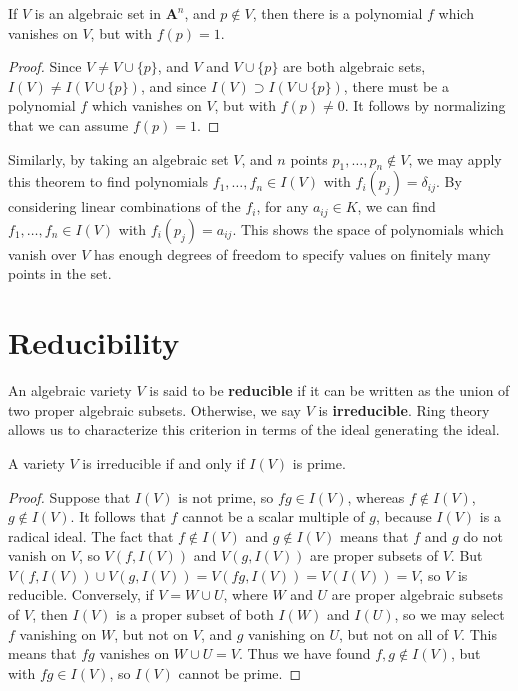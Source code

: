 \begin{corollary}
    If $V$ is an algebraic set in $\mathbf{A}^n$, and $p \not \in V$, then there is a polynomial $f$ which vanishes on $V$, but with $f(p) = 1$.
\end{corollary}
\begin{proof}
    Since $V \neq V \cup \{ p \}$, and $V$ and $V \cup \{ p \}$ are both algebraic sets, $I(V) \neq I(V \cup \{ p \})$, and since $I(V) \supset I(V \cup \{ p \})$, there must be a polynomial $f$ which vanishes on $V$, but with $f(p) \neq 0$. It follows by normalizing that we can assume $f(p) = 1$.
\end{proof}

Similarly, by taking an algebraic set $V$, and $n$ points $p_1, \dots, p_n \not \in V$, we may apply this theorem to find polynomials $f_1, \dots, f_n \in I(V)$ with $f_i(p_j) = \delta_{ij}$. By considering linear combinations of the $f_i$, for any $a_{ij} \in K$, we can find $f_1, \dots, f_n \in I(V)$ with $f_i(p_j) = a_{ij}$. This shows the space of polynomials which vanish over $V$ has enough degrees of freedom to specify values on finitely many points in the set.

\section{Reducibility}

An algebraic variety $V$ is said to be {\bf reducible} if it can be written as the union of two proper algebraic subsets. Otherwise, we say $V$ is {\bf irreducible}. Ring theory allows us to characterize this criterion in terms of the ideal generating the ideal.

\begin{prop}
    A variety $V$ is irreducible if and only if $I(V)$ is prime.
\end{prop}
\begin{proof}
    Suppose that $I(V)$ is not prime, so $fg \in I(V)$, whereas $f \not \in I(V)$, $g \not \in I(V)$. It follows that $f$ cannot be a scalar multiple of $g$, because $I(V)$ is a radical ideal. The fact that $f \not \in I(V)$ and $g \not \in I(V)$ means that $f$ and $g$ do not vanish on $V$, so $V(f, I(V))$ and $V(g, I(V))$ are proper subsets of $V$. But $V(f, I(V)) \cup V(g, I(V)) = V(fg, I(V)) = V(I(V)) = V$, so $V$ is reducible. Conversely, if $V = W \cup U$, where $W$ and $U$ are proper algebraic subsets of $V$, then $I(V)$ is a proper subset of both $I(W)$ and $I(U)$, so we may select $f$ vanishing on $W$, but not on $V$, and $g$ vanishing on $U$, but not on all of $V$. This means that $fg$ vanishes on $W \cup U = V$. Thus we have found $f,g \not \in I(V)$, but with $fg \in I(V)$, so $I(V)$ cannot be prime.
\end{proof}


